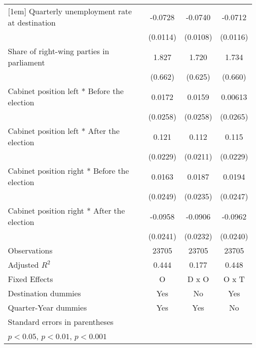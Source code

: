 \begin{table}[htbp]
\begin{tabular}{l*{3}{c}}
[1em]
Quarterly unemployment rate at destination&     -0.0728\sym{***}&     -0.0740\sym{***}&     -0.0712\sym{***}\\
                    &    (0.0114)         &    (0.0108)         &    (0.0116)         \\
[1em]
Share of right-wing parties in parliament&       1.827\sym{**} &       1.720\sym{**} &       1.734\sym{*}  \\
                    &     (0.662)         &     (0.625)         &     (0.660)         \\
[1em]
Cabinet position left * Before the election&      0.0172         &      0.0159         &     0.00613         \\
                    &    (0.0258)         &    (0.0258)         &    (0.0265)         \\
[1em]
Cabinet position left * After the election&       0.121\sym{***}&       0.112\sym{***}&       0.115\sym{***}\\
                    &    (0.0229)         &    (0.0211)         &    (0.0229)         \\
[1em]
Cabinet position right * Before the election&      0.0163         &      0.0187         &      0.0194         \\
                    &    (0.0249)         &    (0.0235)         &    (0.0247)         \\
[1em]
Cabinet position right * After the election&     -0.0958\sym{***}&     -0.0906\sym{***}&     -0.0962\sym{***}\\
                    &    (0.0241)         &    (0.0232)         &    (0.0240)         \\
\hline
Observations        &       23705         &       23705         &       23705         \\
Adjusted \(R^{2}\)  &       0.444         &       0.177         &       0.448         \\
Fixed Effects       &           O         &       D x O         &       O x T         \\
Destination dummies &         Yes         &          No         &         Yes         \\
Quarter-Year dummies&         Yes         &         Yes         &          No         \\
\hline\hline
\multicolumn{4}{l}{\footnotesize Standard errors in parentheses}\\
\multicolumn{4}{l}{\footnotesize \sym{*} \(p<0.05\), \sym{**} \(p<0.01\), \sym{***} \(p<0.001\)}\\
\end{tabular}
\end{table}
